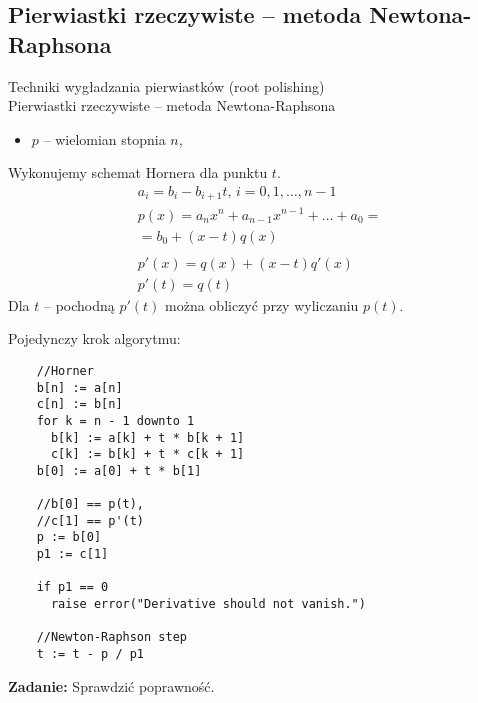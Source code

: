 \subsection{Pierwiastki rzeczywiste -- metoda Newtona-Raphsona}

\begin{frame}{Techniki wygładzania pierwiastków (root polishing) \\Pierwiastki rzeczywiste -- metoda Newtona-Raphsona}
  \begin{itemize}
    \item $p$ -- wielomian stopnia $n$,
  \end{itemize}
    Wykonujemy schemat Hornera dla punktu $t$.
    \begin{gather*}
      a_i = b_i - b_{i + 1} t \text{, } i = 0, 1, \dots, n - 1 \\
      p(x) = a_n x^n + a_{n - 1} x^{n - 1} + \ldots + a_0 =\\
      = b_0 + (x - t) q(x)\\ \\
      p'(x) = q(x) + (x - t) q'(x)\\
      p'(t) = q(t)
    \end{gather*}
    Dla $t$ -- pochodną $p'(t)$ można obliczyć przy wyliczaniu $p(t)$.
\end{frame}

\begin{frame}[fragile]
  Pojedynczy krok algorytmu:
  \begin{lstlisting}
    //Horner
    b[n] := a[n]
    c[n] := b[n]
    for k = n - 1 downto 1
      b[k] := a[k] + t * b[k + 1]
      c[k] := b[k] + t * c[k + 1]
    b[0] := a[0] + t * b[1]

    //b[0] == p(t),
    //c[1] == p'(t)
    p := b[0]
    p1 := c[1]

    if p1 == 0
      raise error("Derivative should not vanish.")

    //Newton-Raphson step
    t := t - p / p1
  \end{lstlisting}

  \textbf{Zadanie:} Sprawdzić poprawność.
\end{frame}
